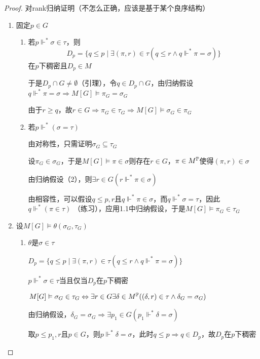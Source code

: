 \documentclass[11pt]{article}
\begin{document}
\begin{proof}
对rank归纳证明（不怎么正确，应该是基于某个良序结构）

\begin{enumerate}
\item 固定\(p\in G\)
\begin{enumerate}
\item 若\(p\Vdash^*\sigma\in\tau\)，则
\begin{equation*}
D_p=\{q\le p\mid\exists(\pi,r)\in\tau(q\le r\wedge q\Vdash^*\pi=\sigma)\}
\end{equation*}
在\(p\)下稠密且\(D_p\in M\)

于是\(D_p\cap G\neq\emptyset\)（引理），令\(q\in D_p\cap G\)，由归纳假设
\(q\Vdash^*\pi=\sigma\Rightarrow M[G]\vDash\pi_G=\sigma_G\)

由于\(r\ge q\)，故\(r\in G\Rightarrow\pi_G\in\tau_G\Rightarrow M[G]\vDash\sigma_G\in\pi_G\)

\item 若\(p\Vdash^*(\sigma=\tau)\)

由对称性，只需证明\(\sigma_G\subseteq\tau_G\)

设\(\pi_G\in\sigma_G\)，于是\(M[G]\vDash\pi\in\sigma\)则存在\(r\in G\)，\(\pi\in M^{\P}\)使得\((\pi,r)\in\sigma\)

由归纳假设（2），则\(\exists r\in G(r\Vdash^*\pi\in\sigma)\)

由相容性，可以假设\(q\le p,r\)且\(q\Vdash^*\pi\in\sigma\)，而\(q\Vdash^*\sigma=\tau\)，因此\(q\Vdash^*(\pi\in\tau)\)
（练习），应用1.1中归纳假设，于是\(M[G]\vDash\pi_G\in\tau_G\)
\end{enumerate}

\item 设\(M[G]\vDash\theta(\sigma_G,\tau_G)\)
\begin{enumerate}
\item \(\theta\)是\(\sigma\in\tau\)

\(D_p=\{q\le p\mid\exists(\pi,r)\in\tau(q\le r\wedge q\Vdash^*\pi=\sigma)\}\)

\(p\Vdash^*\sigma\in\tau\)当且仅当\(D_p\)在\(p\)下稠密

\(M[G]\vDash\sigma_G\in\tau_G\Leftrightarrow\exists r\in G\exists\delta\in M^{\P}((\delta,r)\in\tau\wedge\delta_G=\sigma_G)\)

由归纳假设，\(\delta_G=\sigma_G\Rightarrow\exists p_1\in G(p_1\Vdash^*\delta=\sigma)\)

取\(p\le p_1,r\)且\(p\in G\)，则\(p\Vdash^*\delta=\sigma\)，此时\(q\le p\Rightarrow q\in D_p\)，故\(D_p\)在\(p\)下稠密


\end{enumerate}
\end{enumerate}
\end{proof}
\end{document}
